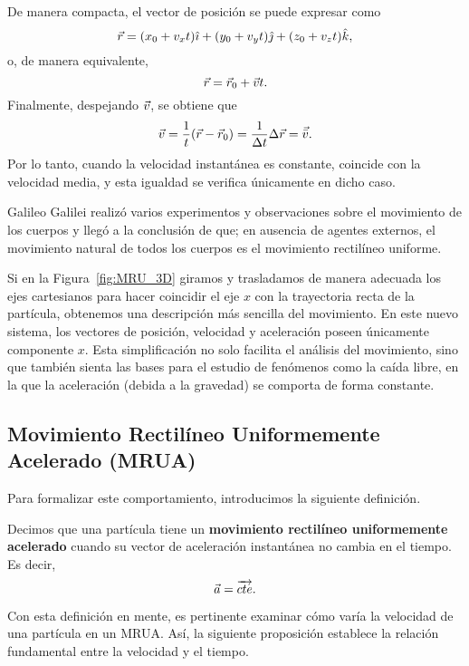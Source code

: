 \begin{proposition}{}{}
\begin{demo}
        De manera compacta, el vector de posición se puede expresar como
        $$\vec{r} = (x_0 + v_x t)\hat{\imath} + (y_0 + v_y t)\hat{\jmath} + (z_0 + v_z t)\hat{k},$$
        o, de manera equivalente,
        $$\vec{r} = \vec{r}_0 + \vec{v} t.$$
        Finalmente, despejando $\vec{v}$, se obtiene que
        $$\vec{v} = \frac{1}{t} (\vec{r} - \vec{r}_0) = \frac{1}{\Delta t} \Delta\vec{r} = \vec{\bar{v}}.$$
        Por lo tanto, cuando la velocidad instantánea es constante, coincide con la velocidad media, y esta igualdad se verifica únicamente en dicho caso.
    \end{demo}
\end{proposition}

Galileo Galilei realizó varios experimentos y observaciones sobre el movimiento de los cuerpos y llegó a la conclusión de que; en ausencia de agentes externos, el movimiento natural de todos los cuerpos es el movimiento rectilíneo uniforme.

Si en la Figura~\ref{fig:MRU_3D} giramos y trasladamos de manera adecuada los ejes cartesianos para hacer coincidir el eje $x$ con la trayectoria recta de la partícula, obtenemos una descripción más sencilla del movimiento. En este nuevo sistema, los vectores de posición, velocidad y aceleración poseen únicamente componente $x$. Esta simplificación no solo facilita el análisis del movimiento, sino que también sienta las bases para el estudio de fenómenos como la caída libre, en la que la aceleración (debida a la gravedad) se comporta de forma constante.

\subsection{Movimiento Rectilíneo Uniformemente Acelerado (MRUA)}

Para formalizar este comportamiento, introducimos la siguiente definición.

\begin{definition}{}{}
    Decimos que una partícula tiene un \textbf{movimiento rectilíneo uniformemente acelerado} cuando su vector de aceleración instantánea no cambia en el tiempo. Es decir,
    $$\vec{a} = \overrightarrow{cte}.$$
\end{definition}

Con esta definición en mente, es pertinente examinar cómo varía la velocidad de una partícula en un MRUA. Así, la siguiente proposición establece la relación fundamental entre la velocidad y el tiempo.

